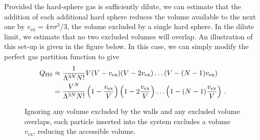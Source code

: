 \documentclass{article}
\theoremstyle{plain}\theoremheaderfont{\normalfont\bfseries}\theorembodyfont{\rmfamily}\theoremseparator{.}\newtheorem*{thm}{Theorem}\newtheorem*{law}{Law}\newtheorem*{pos}{Postulate}
\numberwithin{equation}{section}
\begin{document}
    Provided the hard-sphere gas is sufficiently dilute, we can estimate that the addition of each additional hard sphere reduces the volume available to the next one by \(v_{\text{ex}}=4\pi\sigma^3/3\), the volume excluded by a single hard sphere. In the dilute limit, we estimate that no two excluded volumes will overlap. An illustration of this set-up is given in the figure below. In this case, we can simply modify the perfect gas partition function to give
    \begin{align}
        Q_{\text{HS}}&\approx\frac{1}{\Lambda^{3N}N!}V(V-v_{\text{ex}})(V-2v_{\text{ex}})\dots(V-(N-1)v_{\text{ex}})\notag\\
        &=\frac{V^N}{\Lambda^{3N}N!}\left(1-\frac{v_{\text{ex}}}{V}\right)\left(1-2\frac{v_{\text{ex}}}{V}\right)\dots\left(1-(N-1)\frac{v_{\text{ex}}}{V}\right)\,.
    \end{align}
    \begin{figure}[ht!]
        \centering
        \caption{Ignoring any volume excluded by the walls and any excluded volume overlaps, each particle inserted into the system excludes a volume \(v_{\text{ex}}\), reducing the accessible volume.}
    \end{figure}
    
\end{document}
